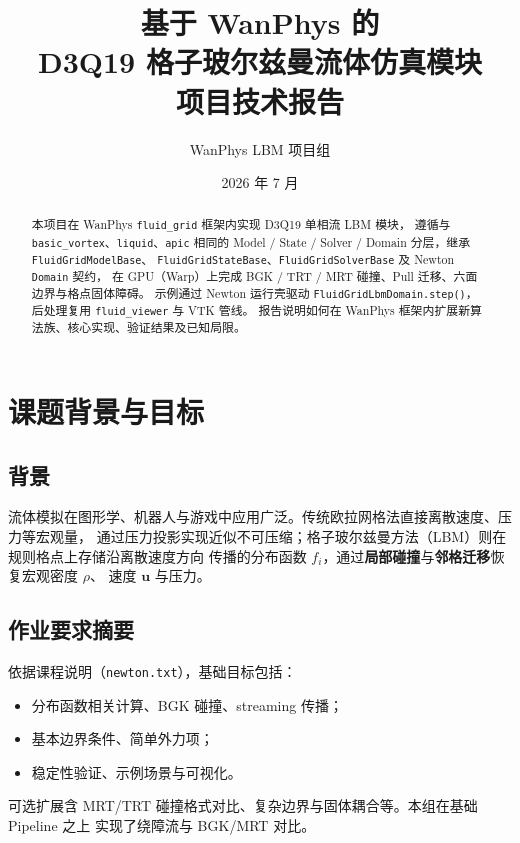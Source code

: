 \documentclass[UTF8,a4paper,11pt]{ctexart}
\title{\textbf{基于 WanPhys 的\\D3Q19 格子玻尔兹曼流体仿真模块}\\[0.6em]
  \large 项目技术报告}
\author{WanPhys LBM 项目组}
\date{2026 年 7 月}
\newcommand{\vecu}{\mathbf{u}}
\begin{document}
\maketitle

\begin{abstract}
  本项目在 WanPhys \texttt{fluid\_grid} 框架内实现 D3Q19 单相流 LBM 模块，
  遵循与 \texttt{basic\_vortex}、\texttt{liquid}、\texttt{apic} 相同的
  Model / State / Solver / Domain 分层，继承 \texttt{FluidGridModelBase}、
  \texttt{FluidGridStateBase}、\texttt{FluidGridSolverBase} 及 Newton \texttt{Domain} 契约，
  在 GPU（Warp）上完成 BGK / TRT / MRT 碰撞、Pull 迁移、六面边界与格点固体障碍。
  示例通过 Newton 运行壳驱动 \texttt{FluidGridLbmDomain.step()}，后处理复用
  \texttt{fluid\_viewer} 与 VTK 管线。
  报告说明如何在 WanPhys 框架内扩展新算法族、核心实现、验证结果及已知局限。
\end{abstract}

\tableofcontents
\newpage

\section{课题背景与目标}

\subsection{背景}

流体模拟在图形学、机器人与游戏中应用广泛。传统欧拉网格法直接离散速度、压力等宏观量，
通过压力投影实现近似不可压缩；格子玻尔兹曼方法（LBM）则在规则格点上存储沿离散速度方向
传播的分布函数 $f_i$，通过\textbf{局部碰撞}与\textbf{邻格迁移}恢复宏观密度 $\rho$、
速度 $\vecu$ 与压力。

\subsection{作业要求摘要}

依据课程说明（\texttt{newton.txt}），基础目标包括：
\begin{itemize}
  \item 分布函数相关计算、BGK 碰撞、streaming 传播；
  \item 基本边界条件、简单外力项；
  \item 稳定性验证、示例场景与可视化。
\end{itemize}
可选扩展含 MRT/TRT 碰撞格式对比、复杂边界与固体耦合等。本组在基础 Pipeline 之上
实现了绕障流与 BGK/MRT 对比。
\end{document}

